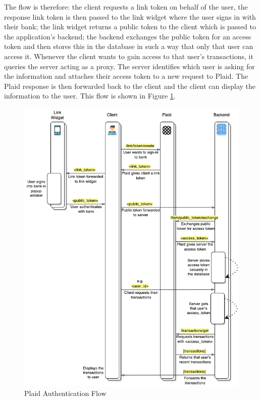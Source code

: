 The flow is therefore: the client requests a link token on behalf of the user, the response link token is then passed to the link widget where the user signs in with their bank; the link widget returns a public token to the client which is passed to the application's backend; the backend exchanges the public token for an access token and then stores this in the database in such a way that only that user can access it. Whenever the client wants to gain access to that user's transactions, it queries the server acting as a proxy. The server identifies which user is asking for the information and attaches their access token to a new request to Plaid. The Plaid response is then forwarded back to the client and the client can display the information to the user. This flow is shown in Figure \ref{fig:plaid_auth_flow}.

\begin{figure}[h!]
	\centering
    \includegraphics[width=\textwidth]{Plaid_auth_flow_sequence_diagram.png}
	\vspace{-0.8cm}
    \caption{Plaid Authentication Flow}
    \label{fig:plaid_auth_flow}
\end{figure}

